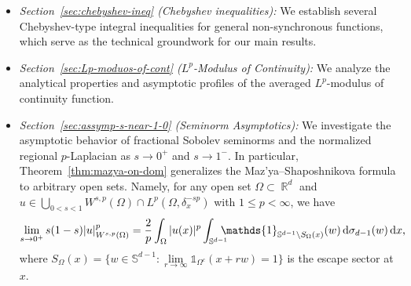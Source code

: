 \documentclass[12pt, reqno]{amsart}%
\theoremstyle{plain}  %
\theoremstyle{definition}  %
\theoremstyle{remark}
\numberwithin{equation}{section}
\DeclareMathOperator{\R}{\mathbb{R}}
\renewcommand{\d}{\,\mathrm{d}}
\begin{document}
\begin{itemize}
    \item \textit{Section~\ref{sec:chebyshev-ineq} (Chebyshev inequalities):} We establish several Chebyshev-type integral inequalities for general non-synchronous functions, which serve as the technical groundwork for our main results.

    \item \textit{Section~\ref{sec:Lp-moduos-of-cont} ($L^p$-Modulus of Continuity):} We analyze the analytical properties and asymptotic profiles of the averaged $L^p$-modulus of continuity function.

    \item \textit{Section~\ref{sec:assymp-s-near-1-0} (Seminorm Asymptotics):} We investigate the asymptotic behavior of fractional Sobolev seminorms and the normalized regional $p$-Laplacian as $s \to 0^+$ and $s \to 1^-$.  In particular, Theorem~\ref{thm:mazya-on-dom} generalizes the Maz'ya--Shaposhnikova formula to arbitrary open sets.
 Namely, for any open set $\Omega \subset \R^d$ and $u \in \bigcup_{0 < s < 1} W^{s,p}(\Omega) \cap L^p(\Omega, \delta_x^{-sp})$ with $1 \le p < \infty$, we have
\begin{align*}
\lim_{s \to 0^+} s(1-s)|u|^p_{W^{s,p}(\Omega)}=
\frac{2}{p} \int_\Omega |u(x)|^p
\int_{ \mathbb{S}^{d-1}}\hspace{-2ex} \mathds{1}_{\mathbb{S}^{d-1}\setminus S_\Omega(x)}(w)\d \sigma_{d-1}(w)  \d x,
\end{align*}
where $S_\Omega(x) =
 \{ w \in \mathbb{S}^{d-1} :  \lim\limits_{r\to \infty} \mathds{1}_{\Omega^c}(x+rw)=1\}$ is the escape sector at $x$.


\end{itemize}
\end{document}
